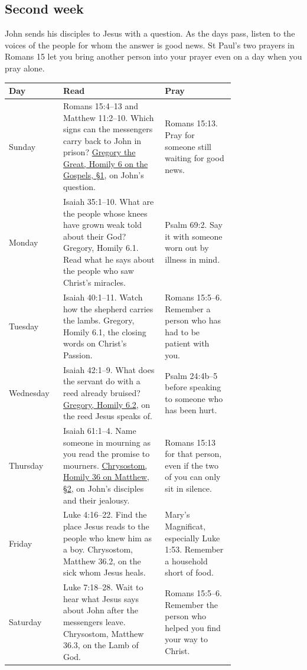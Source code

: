 \subsection{Second week}

John sends his disciples to Jesus with a question. As the days pass,
listen to the voices of the people for whom the answer is good news.
St Paul's two prayers in Romans 15 let you bring another person into
your prayer even on a day when you pray alone.

\begin{longtable}{@{}lp{0.45\linewidth}p{0.31\linewidth}@{}}
\textbf{Day} & \textbf{Read} & \textbf{Pray} \\
\hline
\endhead
Sunday & Romans 15:4--13 and Matthew 11:2--10. Which signs can the messengers carry back to John in prison? \href{https://archive.org/details/romanbreviaryref01cathuoft/page/229/mode/1up}{Gregory the Great, Homily 6 on the Gospels, §1}, on John's question. & Romans 15:13. Pray for someone still waiting for good news. \\
Monday & Isaiah 35:1--10. What are the people whose knees have grown weak told about their God? Gregory, Homily 6.1. Read what he says about the people who saw Christ's miracles. & Psalm 69:2. Say it with someone worn out by illness in mind. \\
Tuesday & Isaiah 40:1--11. Watch how the shepherd carries the lambs. Gregory, Homily 6.1, the closing words on Christ's Passion. & Romans 15:5--6. Remember a person who has had to be patient with you. \\
Wednesday & Isaiah 42:1--9. What does the servant do with a reed already bruised? \href{https://archive.org/details/romanbreviaryref01cathuoft/page/230/mode/1up}{Gregory, Homily 6.2}, on the reed Jesus speaks of. & Psalm 24:4b--5 before speaking to someone who has been hurt. \\
Thursday & Isaiah 61:1--4. Name someone in mourning as you read the promise to mourners. \href{https://www.newadvent.org/fathers/200136.htm}{Chrysostom, Homily 36 on Matthew, §2}, on John's disciples and their jealousy. & Romans 15:13 for that person, even if the two of you can only sit in silence. \\
Friday & Luke 4:16--22. Find the place Jesus reads to the people who knew him as a boy. Chrysostom, Matthew 36.2, on the sick whom Jesus heals. & Mary's Magnificat, especially Luke 1:53. Remember a household short of food. \\
Saturday & Luke 7:18--28. Wait to hear what Jesus says about John after the messengers leave. Chrysostom, Matthew 36.3, on the Lamb of God. & Romans 15:5--6. Remember the person who helped you find your way to Christ. \\
\end{longtable}

